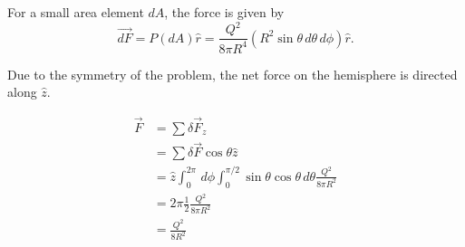 \documentclass{esg8022pset}
\begin{document}
\begin{solution}
  For a small area element $dA$, the force is given by
  $$\vec{dF} = P(dA)\hat r = \frac{Q^2}{8\pi R^4}(R^2\sin\theta\,d\theta\,d\phi)\hat r.$$
  
  Due to the symmetry of the problem, the net force on the hemisphere
  is directed along $\hat z$.
  
  \begin{align*}
    \vec F & = \sum \delta \vec F_z \\
           & = \sum \delta \vec F \cos\theta\hat z \\
           & = \hat z \int_0^{2\pi}\,d\phi\int_0^{\pi / 2}\sin\theta\cos\theta\,d\theta \frac{Q^2}{8\pi R^2} \\
           & = 2\pi \frac12 \frac{Q^2}{8\pi R^2} \\
           & = \frac{Q^2}{8 R^2}
  \end{align*}
  
  
  

\end{solution}
\end{document}
